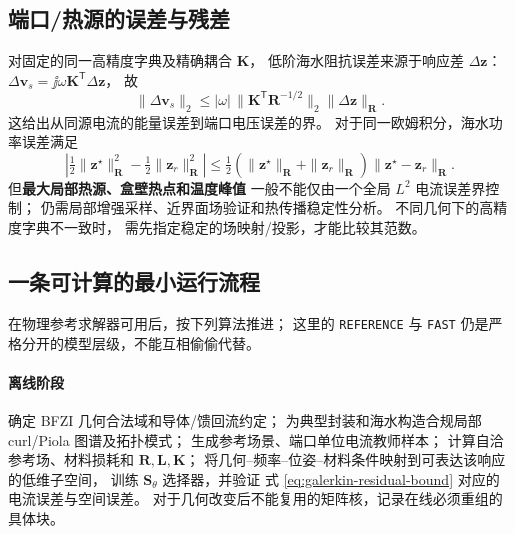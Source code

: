 \subsection{端口/热源的误差与残差}
对固定的同一高精度字典及精确耦合 \(\bm K\)，
低阶海水阻抗误差来源于响应差
\(\Delta\bm z\)：
\(\Delta\bm v_s=\jj\omega\bm K^{\mathsf T}\Delta\bm z\)，
故
\[
\|\Delta\bm v_s\|_2
\le |\omega|\,\|\bm K^{\mathsf T}\bm R^{-1/2}\|_2
\|\Delta\bm z\|_{\bm R}.
\]
这给出从同源电流的能量误差到端口电压误差的界。
对于同一欧姆积分，海水功率误差满足
\begin{equation}
\left|
\tfrac12\|\bm z^\star\|_{\bm R}^2
-\tfrac12\|\bm z_r\|_{\bm R}^2
\right|
\le \tfrac12
(\|\bm z^\star\|_{\bm R}+\|\bm z_r\|_{\bm R})
\|\bm z^\star-\bm z_r\|_{\bm R}.
\label{eq:loss-error}
\end{equation}
但\textbf{最大局部热源、盒壁热点和温度峰值}
一般不能仅由一个全局 \(L^2\) 电流误差界控制；
仍需局部增强采样、近界面场验证和热传播稳定性分析。
不同几何下的高精度字典不一致时，
需先指定稳定的场映射/投影，才能比较其范数。

\subsection{一条可计算的最小运行流程}
在物理参考求解器可用后，按下列算法推进；
这里的 \texttt{REFERENCE} 与 \texttt{FAST}
仍是严格分开的模型层级，不能互相偷偷代替。

\paragraph{离线阶段}
确定 BFZI 几何合法域和导体/馈回流约定；
为典型封装和海水构造合规局部 curl/Piola 图谱及拓扑模式；
生成参考场景、端口单位电流教师样本；
计算自洽参考场、材料损耗和 \(\bm R,\bm L,\bm K\)；
将几何--频率--位姿--材料条件映射到可表达该响应的低维子空间，
训练 \(\bm S_\theta\) 选择器，并验证
式 \eqref{eq:galerkin-residual-bound} 对应的电流误差与空间误差。
对于几何改变后不能复用的矩阵核，记录在线必须重组的具体块。

